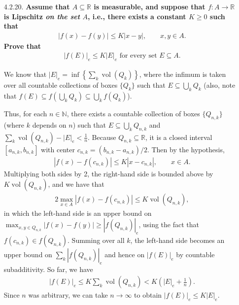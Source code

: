 \documentclass[a4paper,12pt]{article}
\DeclareMathOperator*{\vol}{vol}
\begin{document}
\begin{enumerate}
    \item[4.2.20.]
        \boldmath\textbf{Assume that $A \subseteq \mathbb{R}$ is measurable, and suppose that $f : A \to \mathbb{R}$ is Lipschitz \emph{on the set} $A$, i.e., there exists a constant $K \geq 0$ such that
        \begin{align*}
            |f(x) - f(y)| \leq K|x - y|, \qquad x, y \in A.
        \end{align*}
        Prove that
        \begin{align*}
            |f(E)|_e \leq K|E|_e \text{ for every set } E \subseteq A.
        \end{align*}
        }\unboldmath \par
        We know that
        $|E|_e = \inf\left\{ \sum_k \vol(Q_k) \right\}$,
        where the infimum is taken over all countable collections of boxes $\{Q_k\}$ such that $E \subseteq \bigcup_k Q_k$ (also, note that $f(E) \subseteq f(\bigcup_k Q_k) \subseteq \bigcup_k f(Q_k)$). \par
        Thus, for each $n \in \mathbb{N}$, there exists a countable collection of boxes $\{Q_{n, k}\}$ (where $k$ depends on $n$) such that $E \subseteq \bigcup_k Q_{n, k}$ and $\sum_k \vol(Q_{n, k}) - |E|_e < \frac{1}{n}$. Because $Q_{n, k} \subseteq \mathbb{R}$, it is a closed interval $[a_{n, k}, b_{n, k}]$ with center $c_{n, k} = (b_{n, k} - a_{n, k})/2$. Then by the hypothesis,
        \begin{align*}
            |f(x) - f(c_{n, k})| \leq K|x - c_{n, k}|, \qquad x \in A.
        \end{align*}
        Multiplying both sides by 2, the right-hand side is bounded above by $K \vol(Q_{n, k})$, and we have that
        \begin{align*}
            2\max_{x \in A} |f(x) - f(c_{n, k})| \leq K \vol(Q_{n, k}),
        \end{align*}
        in which the left-hand side is an upper bound on $\max_{x, y \in Q_{n, k}} |f(x) - f(y)| \geq |f(Q_{n, k})|_e$, using the fact that $f(c_{n, k}) \in f(Q_{n, k})$. Summing over all $k$, the left-hand side becomes an upper bound on $\sum_k |f(Q_{n, k})|_e$ and hence on $|f(E)|_e$ by countable subadditivity. So far, we have
        \begin{align*}
            |f(E)|_e \leq K \sum_k \vol(Q_{n, k}) < K(|E|_e + \frac{1}{n}).
        \end{align*}
        Since $n$ was arbitrary, we can take $n \to \infty$ to obtain $|f(E)|_e \leq K|E|_e$.


\end{enumerate}
\end{document}

